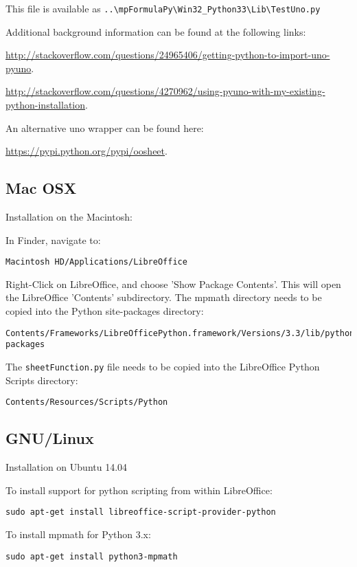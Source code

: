 This file is available as 
\verb|..\mpFormulaPy\Win32_Python33\Lib\TestUno.py|


Additional background information can be found at the following links:

\vpara
\href{http://stackoverflow.com/questions/24965406/getting-python-to-import-uno-pyuno}{http://stackoverflow.com/questions/24965406/getting-python-to-import-uno-pyuno}. 


\vpara
\href{http://stackoverflow.com/questions/4270962/using-pyuno-with-my-existing-python-installation}{http://stackoverflow.com/questions/4270962/using-pyuno-with-my-existing-python-installation}. 

An alternative uno wrapper can be found here:


\vpara
\href{https://pypi.python.org/pypi/oosheet}{https://pypi.python.org/pypi/oosheet}. 


\subsection{Mac OSX}
Installation on the Macintosh:

In Finder, navigate to:
\begin{verbatim}
Macintosh HD/Applications/LibreOffice
\end{verbatim}	
Right-Click on LibreOffice, and choose 'Show Package Contents'. This will open the LibreOffice  'Contents' subdirectory.
The mpmath directory needs to be copied into the Python site-packages directory:
\begin{verbatim}
Contents/Frameworks/LibreOfficePython.framework/Versions/3.3/lib/python3.3/site-packages
\end{verbatim}
The \verb|sheetFunction.py| file needs to be copied into the  LibreOffice Python Scripts directory:
\begin{verbatim}
Contents/Resources/Scripts/Python
\end{verbatim}


\subsection{GNU/Linux}
Installation on Ubuntu 14.04

To install support for python scripting from within LibreOffice:
\begin{verbatim}
sudo apt-get install libreoffice-script-provider-python
\end{verbatim}

To install mpmath for Python 3.x:
\begin{verbatim}
sudo apt-get install python3-mpmath
\end{verbatim}

